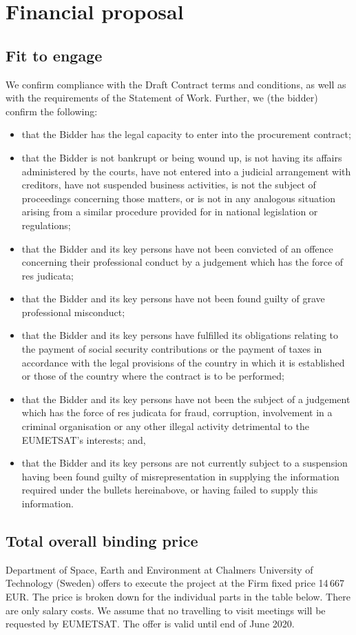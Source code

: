 \documentclass[BCOR=1cm,12pt,bibliography=totoc]{article}
\begin{document}
\newpage
\section{Financial proposal}
%
\subsection{Fit to engage}
%
We confirm compliance with the Draft Contract terms and conditions, as well as
with the requirements of the Statement of Work. Further, we (the bidder)
confirm the following:
\begin{itemize}
\item that the Bidder has the legal capacity to enter into the procurement contract;
\item that the Bidder is not bankrupt or being wound up, is not having its affairs
administered by the courts, have not entered into a judicial arrangement with creditors,
have not suspended business activities, is not the subject of proceedings concerning
those matters, or is not in any analogous situation arising from a similar procedure
provided for in national legislation or regulations;
\item that the Bidder and its key persons have not been convicted of an offence
concerning their professional conduct by a judgement which has the force of res judicata;
\item that the Bidder and its key persons have not been found guilty of grave
professional misconduct;
\item that the Bidder and its key persons have fulfilled its obligations relating to the
payment of social security contributions or the payment of taxes in accordance with the
legal provisions of the country in which it is established or those of the country where
the contract is to be performed;
\item that the Bidder and its key persons have not been the subject of a judgement which
has the force of res judicata for fraud, corruption, involvement in a criminal organisation
or any other illegal activity detrimental to the EUMETSAT’s interests; and,
\item that the Bidder and its key persons are not currently subject to a suspension
having been found guilty of misrepresentation in supplying the information required
under the bullets hereinabove, or having failed to supply this information.
\end{itemize}


\subsection{Total overall binding price}
%
Department of Space, Earth and Environment at Chalmers University of Technology
(Sweden) offers to execute the project at the Firm fixed price 14\,667 EUR. The
price is broken down for the individual parts in the table below. There are
only salary costs. We assume that no travelling to visit meetings will be
requested by EUMETSAT.
The offer is valid until end of June 2020.\\
\end{document}
